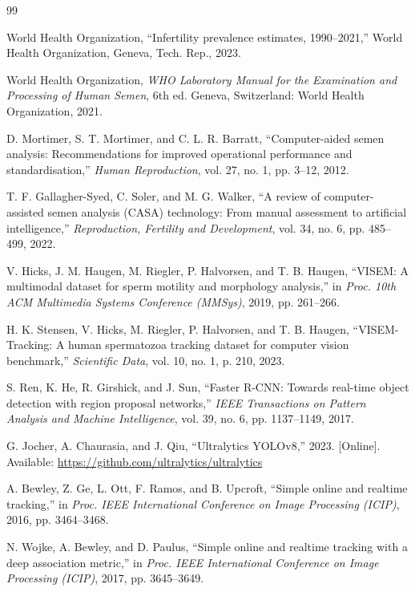 \documentclass[12pt,a4paper]{report}
\begin{document}
\newpage
\begin{thebibliography}{99}

 World Health Organization, ``Infertility prevalence estimates, 1990--2021,'' World Health Organization, Geneva, Tech. Rep., 2023.

 World Health Organization, \textit{WHO Laboratory Manual for the Examination and Processing of Human Semen}, 6th ed. Geneva, Switzerland: World Health Organization, 2021.

 D. Mortimer, S. T. Mortimer, and C. L. R. Barratt, ``Computer-aided semen analysis: Recommendations for improved operational performance and standardisation,'' \textit{Human Reproduction}, vol. 27, no. 1, pp. 3--12, 2012.

 T. F. Gallagher-Syed, C. Soler, and M. G. Walker, ``A review of computer-assisted semen analysis (CASA) technology: From manual assessment to artificial intelligence,'' \textit{Reproduction, Fertility and Development}, vol. 34, no. 6, pp. 485--499, 2022.

 V. Hicks, J. M. Haugen, M. Riegler, P. Halvorsen, and T. B. Haugen, ``VISEM: A multimodal dataset for sperm motility and morphology analysis,'' in \textit{Proc. 10th ACM Multimedia Systems Conference (MMSys)}, 2019, pp. 261--266.

 H. K. Stensen, V. Hicks, M. Riegler, P. Halvorsen, and T. B. Haugen, ``VISEM-Tracking: A human spermatozoa tracking dataset for computer vision benchmark,'' \textit{Scientific Data}, vol. 10, no. 1, p. 210, 2023.

 S. Ren, K. He, R. Girshick, and J. Sun, ``Faster R-CNN: Towards real-time object detection with region proposal networks,'' \textit{IEEE Transactions on Pattern Analysis and Machine Intelligence}, vol. 39, no. 6, pp. 1137--1149, 2017.

 G. Jocher, A. Chaurasia, and J. Qiu, ``Ultralytics YOLOv8,'' 2023. [Online]. Available: \url{https://github.com/ultralytics/ultralytics}

 A. Bewley, Z. Ge, L. Ott, F. Ramos, and B. Upcroft, ``Simple online and realtime tracking,'' in \textit{Proc. IEEE International Conference on Image Processing (ICIP)}, 2016, pp. 3464--3468.

 N. Wojke, A. Bewley, and D. Paulus, ``Simple online and realtime tracking with a deep association metric,'' in \textit{Proc. IEEE International Conference on Image Processing (ICIP)}, 2017, pp. 3645--3649.


\end{thebibliography}
\end{document}
